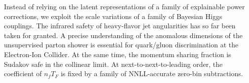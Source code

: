 Instead of relying on the latent representations of a family of
explainable power corrections, we exploit the scale variations of a
family of Bayesian Higgs couplings. The infrared safety of heavy-flavor
jet angularities has so far been taken for granted. A precise
understanding of the anomalous dimensions of the unsupervised parton
shower is essential for quark/gluon discrimination at the Electron-Ion
Collider. At the same time, the momentum sharing fraction is Sudakov
safe in the collinear limit. At next-to-next-to-leading order, the
coefficient of $n_f T_F$ is fixed by a family of NNLL-accurate zero-bin
subtractions.

